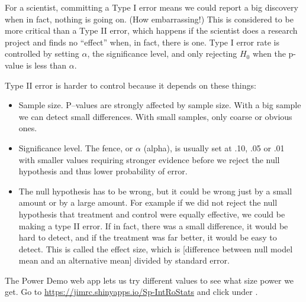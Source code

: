 For a scientist, committing a Type I error means we could report a
big discovery when in fact, nothing is going on. (How embarrassing!)
This is considered to be more critical than a Type II error, which happens if
the scientist does a research project and finds no ``effect'' when, in
fact, there is one. Type I error rate is controlled by setting
$\alpha$, the significance level, and only rejecting $H_0$ when the
p-value is less than $\alpha$. 


Type II error is harder to control because it depends on these things:
\vspace{-.2cm}
\begin{itemize}
\item  Sample size.  P--values are strongly affected by sample
  size. With a big sample we can detect small differences.  With small
  samples, only coarse or obvious ones.
\item  Significance level.  The fence, or $\alpha$ (alpha), is
  usually set at .10, .05 or .01 with smaller values requiring
  stronger evidence before we reject the null hypothesis and thus
  lower probability of error.  
\item  The null hypothesis has to be wrong, but it could be wrong just
  by a small amount or by a large amount.  For example if 
   we did not reject the null hypothesis that treatment and
  control  were equally effective,  we could be making a type II
  error.  If in fact,  there was a small difference, it would be
  hard to detect, and if the treatment was far better, it would
  be easy to detect.  This is called the effect size, which is
  [difference between null model mean and an alternative mean] divided
  by standard error.
\end{itemize}


The Power Demo web app lets us try different values to see what size
power we get.  Go to 
\url{https://jimrc.shinyapps.io/Sp-IntRoStats} and click
 under .

